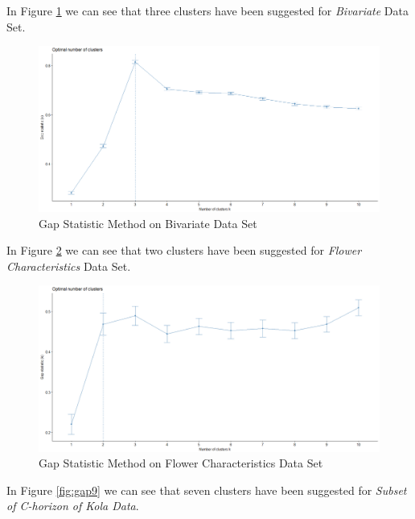 \begin{itemize}
\vspace{15mm}

In Figure \ref{fig:gap7} we can see that three clusters have been suggested for \textit{Bivariate} Data Set.

\begin{figure}[h!]
  \centering
  \includegraphics[scale=1.3]{figures/results/xclara/gap.png}
  \caption{Gap Statistic Method on Bivariate Data Set}
  \label{fig:gap7}
\end{figure}

\newpage

In Figure \ref{fig:gap8} we can see that two clusters have been suggested for \textit{Flower Characteristics} Data Set.

\begin{figure}[h!]
  \centering
  \includegraphics[scale=1.3]{figures/results/flower/gap.png}
  \caption{Gap Statistic Method on Flower Characteristics Data Set}
  \label{fig:gap8}
\end{figure}

\vspace{15mm}

In Figure \ref{fig:gap9} we can see that seven clusters have been suggested for \textit{Subset of C-horizon of Kola Data}.


\end{itemize}
